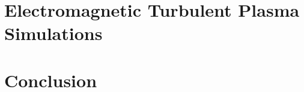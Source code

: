 \documentclass[english]{amu_these}
\begin{document}
	\part[Electromagnetic plasma simulations]{Electromagnetic Turbulent Plasma Simulations}
	\label{part:EM_Impact}
	
	
	
	
	\part[Conclusion]{Conclusion}
	\label{part:Conc}
	

	\appendix

	\newpage
	\printbibliography[heading=bibintoc] %
	
	\newpage
	\printindex							%
	
	\newpage
	\printendnotes						%

\end{document}

